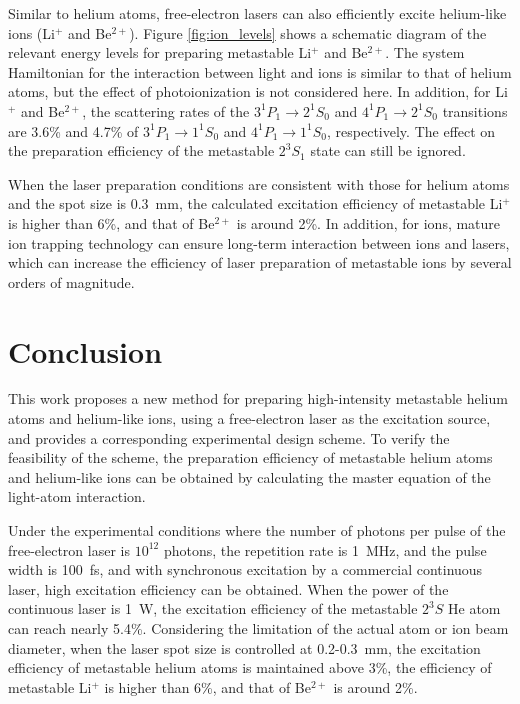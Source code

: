 \documentclass[12pt,a4paper]{article}
\begin{document}
Similar to helium atoms, free-electron lasers can also efficiently excite helium-like ions (Li$^{+}$ and Be$^{2+}$). Figure \ref{fig:ion_levels} shows a schematic diagram of the relevant energy levels for preparing metastable Li$^{+}$ and Be$^{2+}$. The system Hamiltonian for the interaction between light and ions is similar to that of helium atoms, but the effect of photoionization is not considered here. In addition, for Li$^{+}$ and Be$^{2+}$, the scattering rates of the $3^1P_1 \rightarrow 2^1S_0$ and $4^1P_1 \rightarrow 2^1S_0$ transitions are 3.6\% and 4.7\% of $3^1P_1 \rightarrow 1^1S_0$ and $4^1P_1 \rightarrow 1^1S_0$, respectively. The effect on the preparation efficiency of the metastable $2^3S_1$ state can still be ignored.

When the laser preparation conditions are consistent with those for helium atoms and the spot size is \SI{0.3}{mm}, the calculated excitation efficiency of metastable Li$^{+}$ is higher than 6\%, and that of Be$^{2+}$ is around 2\%. In addition, for ions, mature ion trapping technology can ensure long-term interaction between ions and lasers, which can increase the efficiency of laser preparation of metastable ions by several orders of magnitude.

\section{Conclusion}

This work proposes a new method for preparing high-intensity metastable helium atoms and helium-like ions, using a free-electron laser as the excitation source, and provides a corresponding experimental design scheme. To verify the feasibility of the scheme, the preparation efficiency of metastable helium atoms and helium-like ions can be obtained by calculating the master equation of the light-atom interaction.

Under the experimental conditions where the number of photons per pulse of the free-electron laser is $10^{12}$ photons, the repetition rate is \SI{1}{MHz}, and the pulse width is \SI{100}{fs}, and with synchronous excitation by a commercial continuous laser, high excitation efficiency can be obtained. When the power of the continuous laser is \SI{1}{W}, the excitation efficiency of the metastable $2^3S$ He atom can reach nearly 5.4\%. Considering the limitation of the actual atom or ion beam diameter, when the laser spot size is controlled at 0.2-\SI{0.3}{mm}, the excitation efficiency of metastable helium atoms is maintained above 3\%, the efficiency of metastable Li$^{+}$ is higher than 6\%, and that of Be$^{2+}$ is around 2\%.
\end{document}
